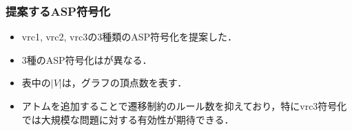 \documentclass[dvipdfmx,11pt]{beamer}
\begin{document}

\begin{frame}\frametitle{提案するASP符号化}

  \begin{itemize}
    \item vrc1, vrc2, vrc3の3種類のASP符号化を提案した．
    \item 3種のASP符号化はが異なる．
    \item 表中の$|V|$は，グラフの頂点数を表す．
  \end{itemize}

  \begin{table}
    \centering
    
  \end{table}

  \begin{itemize}
    \item アトムを追加することで遷移制約のルール数を抑えており，特にvrc3符号化では大規模な問題に対する有効性が期待できる．
  \end{itemize}

\end{frame}

\begin{comment}
\begin{frame}\frametitle{ベンチマーク}

  \begin{itemize}
    \item 現時点で組合せ遷移問題は理論面の研究が主流であり, ベンチマークの整備が必要.
    \item 実験においてステップ$t$を与えるとき, その上限値が必要となる.
    \item ステップ$t$の上限値は, グラフ$G$を$k$彩色するときの実行可能解の数と等しい.
  \end{itemize}

  従って, 全解列挙が可能な($G, k$)からベンチマークを生成する必要がある.
  
\end{frame}
\end{comment}
\end{document}
